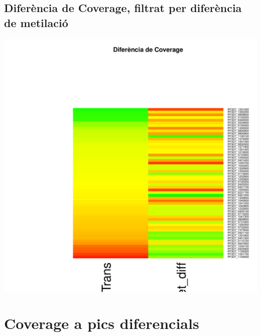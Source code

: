 \documentclass{article}\usepackage[]{graphicx}\usepackage[]{color}
\newenvironment{knitrout}{}{} %
\begin{document}
\subsection{Diferència de Coverage, filtrat per diferència de metilació}
\begin{knitrout}
\color{fgcolor}

{\centering \includegraphics[width=.9\linewidth]{figure/minimal-heat_cov_diff_filter-1} 

}



\end{knitrout}

\clearpage
\section{Coverage a pics diferencials}
\end{document}
